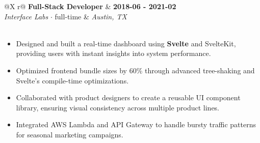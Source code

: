 \documentclass[11pt,letterpaper]{article}
\begin{document}
        \begin{infocard}
        \begin{tabularx}{\linewidth}{@{}X r@{}}
        \textbf{\large\color{headercolor} Full-Stack Developer } & \textbf{\color{accentcolor} 2018-06 - 2021-02 } \\
        \vspace{4pt}
        \textit{\color{headercolor} Interface Labs } \color{accentcolor}  $\cdot$ full-time & \textit{\color{accentcolor} Austin, TX } \\
        
        
             \\
        
        \end{tabularx}

        \vspace{2pt}
        \color{textcolor}
        
            \begin{itemize}[itemsep=2pt, parsep=1pt, leftmargin=1em]
            
                \item
                
                    Designed and built a real-time dashboard using \textbf{Svelte} and SvelteKit, providing users with instant insights into system performance.
                
                
                
            
                \item
                
                    Optimized frontend bundle sizes by 60\% through advanced tree-shaking and Svelte's compile-time optimizations.
                
                
                
            
                \item
                
                    Collaborated with product designers to create a reusable UI component library, ensuring visual consistency across multiple product lines.
                
                
                
            
                \item
                
                    Integrated AWS Lambda and API Gateway to handle bursty traffic patterns for seasonal marketing campaigns.
                
                
                
            
            \end{itemize}
        
        \end{infocard}
        \vspace{6pt}
    
\end{document}
